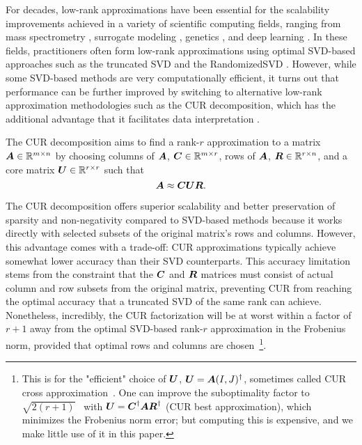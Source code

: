 For decades, low-rank approximations have been essential for the scalability improvements achieved in a variety of scientific computing fields, 
 ranging from mass spectrometry \cite{yang2015identifying}, surrogate modeling \cite{kramer2024learning,zheng2025semilagrangian}, genetics \cite{mahoney2009cur}, and deep learning \cite{flynn2024stat, mai2020vgg, park2025curing}.  In these fields, practitioners often form low-rank approximations using optimal SVD-based  approaches such as the truncated SVD \cite{eckart1936approximation, mirsky1960symmetric} and the RandomizedSVD \cite{halko2011finding}.  However, while some SVD-based methods are very computationally efficient, it turns out that performance can be further improved by switching to alternative low-rank approximation methodologies such as the CUR decomposition, which has the additional advantage that it facilitates data interpretation \cite{mahoney2009cur}. 

The CUR decomposition \cite{goreinov1997theory, mahoney2009cur} aims to find a rank-$r$ approximation to a matrix $\boldsymbol{A} \in \mathbb{R}^{m \times n}$ by choosing columns of $\boldsymbol{A}$, $\boldsymbol{C} \in \mathbb{R}^{m \times r}$, rows of $\boldsymbol{A}$, $\boldsymbol{R} \in \mathbb{R}^{r \times n}$, and a 
core matrix $\boldsymbol{U} \in \mathbb{R}^{r \times r}$ such that 
\begin{equation}
    \boldsymbol{A} \approx \boldsymbol{C} \boldsymbol{U} \boldsymbol{R}.
\end{equation}

The CUR decomposition offers superior scalability and better preservation of sparsity and non-negativity compared to SVD-based methods because it works directly with selected subsets of the original matrix's rows and columns. However, this advantage comes with a trade-off: CUR approximations typically achieve somewhat lower accuracy than their SVD counterparts. This accuracy limitation stems from the constraint that the $\boldsymbol{C}$ and $\boldsymbol{R}$ matrices must consist of actual column and row subsets from the original matrix, preventing CUR from reaching the optimal accuracy that a truncated SVD of the same rank can achieve.
Nonetheless, incredibly, the CUR factorization will be at worst within a factor of $r+1$ away from the optimal SVD-based rank-$r$ approximation in the Frobenius norm, provided that optimal rows and columns are chosen~\cite{cortinovis2020lowrank,deshpande2006no,osinsky2025close}\footnote{This is for the "efficient" choice of $\boldsymbol{U}$, 
$\boldsymbol{U}=\boldsymbol{A}(I,J)^{\dagger}$, sometimes called CUR cross approximation~\cite{park2025accuracy}. 
One can improve the suboptimality factor to $\sqrt{2(r+1)}$~\cite{cortinovis2020lowrank} with $\boldsymbol{U}=\boldsymbol{C}^\dagger \boldsymbol{AR}^\dagger$ (CUR best approximation), which minimizes the Frobenius norm error; but computing this is expensive, and we make little use of it in this paper. }. 



